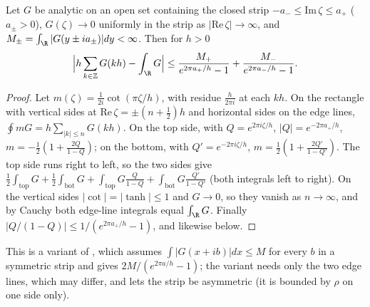 \begin{lemma}\label{lem:trap}
Let $G$ be analytic on an open set containing the closed strip $-a_-\le\mathrm{Im}\,\zeta\le a_+$
($a_\pm>0$), $G(\zeta)\to0$ uniformly in the strip as $|\mathrm{Re}\,\zeta|\to\infty$, and
$M_\pm=\int_\R|G(y\pm ia_\pm)|dy<\infty$. Then for $h>0$
\[
\Bigl|h\sum_{k\in\mathbb Z}G(kh)-\int_\R G\Bigr|\le\frac{M_+}{e^{2\pi a_+/h}-1}+\frac{M_-}{e^{2\pi a_-/h}-1}.
\]
\end{lemma}
\begin{proof}
Let $m(\zeta)=\frac1{2i}\cot(\pi\zeta/h)$, with residue $\frac h{2\pi i}$ at each $kh$. On the rectangle with
vertical sides at $\mathrm{Re}\,\zeta=\pm(n+\frac12)h$ and horizontal sides on the edge lines, $\oint mG=h\sum_{|k|
\le n}G(kh)$. On the top side, with $Q=e^{2\pi i\zeta/h}$, $|Q|=e^{-2\pi a_+/h}$, $m=-\frac12(1+\frac{2Q}{1-Q})$;
on the bottom, with $Q'=e^{-2\pi i\zeta/h}$, $m=\frac12(1+\frac{2Q'}{1-Q'})$. The top side runs right to left,
so the two sides give $\frac12\int_{\mathrm{top}}G+\frac12\int_{\mathrm{bot}}G+\int_{\mathrm{top}}G\frac Q{1-Q}
+\int_{\mathrm{bot}}G\frac{Q'}{1-Q'}$ (both integrals left to right). On the vertical sides $|\cot|=|\tanh|\le1$
and $G\to0$, so they vanish as $n\to\infty$, and by Cauchy both edge-line integrals equal $\int_\R G$. Finally
$|Q/(1-Q)|\le1/(e^{2\pi a_+/h}-1)$, and likewise below.
\end{proof}

This is a variant of \cite[Thm.~5.1]{tw}, which assumes $\int|G(x+ib)|dx\le M$ for every $b$ in a symmetric strip
and gives $2M/(e^{2\pi a/h}-1)$; the variant needs only the two edge lines, which may differ, and lets the strip
be asymmetric (it is bounded by $\rho$ on one side only).


